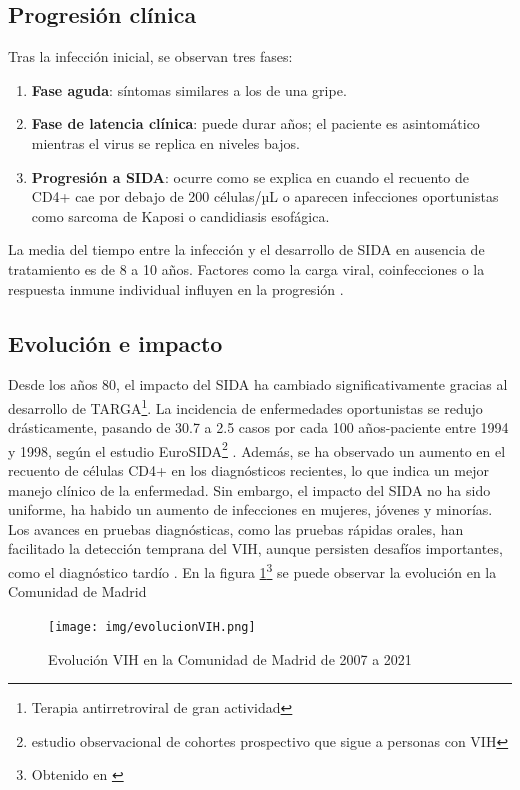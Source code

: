 \subsection{Progresión clínica}
Tras la infección inicial, se observan tres fases:
\begin{enumerate}
    \item \textbf{Fase aguda}: síntomas similares a los de una gripe.
    \item \textbf{Fase de latencia clínica}: puede durar años; el paciente es asintomático mientras el virus se replica en niveles bajos.
    \item \textbf{Progresión a SIDA}: ocurre como se explica en \cite{okoye2013cd}cuando el recuento de CD4+ cae por debajo de 200 células/µL o aparecen infecciones oportunistas como sarcoma de Kaposi o candidiasis esofágica.
\end{enumerate}
La media del tiempo entre la infección y el desarrollo de SIDA en ausencia de tratamiento es de 8 a 10 años. Factores como la carga viral, coinfecciones o la respuesta inmune individual influyen en la progresión \cite{hoover1992progression}.

\subsection{Evolución e impacto}
Desde los años 80, el impacto del SIDA ha cambiado significativamente gracias al desarrollo de TARGA\footnote{Terapia antirretroviral de gran actividad}. La incidencia de enfermedades oportunistas se redujo drásticamente, pasando de 30.7 a 2.5 casos por cada 100 años-paciente entre 1994 y 1998, según el estudio EuroSIDA\footnote{estudio observacional de cohortes prospectivo que sigue a personas con VIH} \cite{mocroft2000aids}. Además, se ha observado un aumento en el recuento de células CD4+ en los diagnósticos recientes, lo que indica un mejor manejo clínico de la enfermedad. Sin embargo, el impacto del SIDA no ha sido uniforme, ha habido un aumento de infecciones en mujeres, jóvenes y minorías. Los avances en pruebas diagnósticas, como las pruebas rápidas orales, han facilitado la detección temprana del VIH, aunque persisten desafíos importantes, como el diagnóstico tardío \cite{san2003incidence}.
En la figura \ref{fig:evolución vih}\footnote{Obtenido en \cite{madrid_salud_poblacion}} se puede observar la evolución en la Comunidad de Madrid 

\begin{figure}[H]
    \centering
    \texttt{[image: img/evolucionVIH.png]}
    \caption{Evolución VIH en la Comunidad de Madrid de 2007 a 2021}
    \label{fig:evolución vih}
    \vspace{0.5cm} %
\end{figure}

